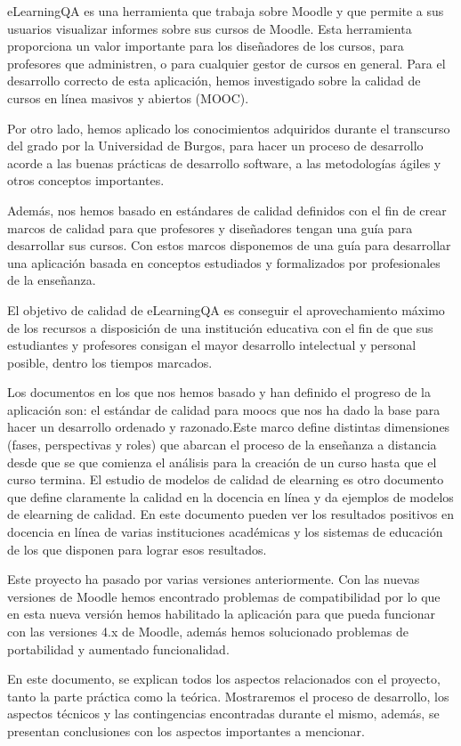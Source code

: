 
eLearningQA es una herramienta que trabaja sobre Moodle y que permite a sus usuarios visualizar informes sobre sus cursos de Moodle. Esta herramienta proporciona un valor importante para los diseñadores de los cursos, para profesores que administren, o para cualquier gestor de cursos en general. Para el desarrollo correcto de esta aplicación, hemos investigado sobre la calidad de cursos en línea masivos y abiertos (MOOC).


Por otro lado, hemos aplicado los conocimientos adquiridos durante el transcurso del grado por la Universidad de Burgos, para hacer un proceso de desarrollo acorde a las buenas prácticas de desarrollo software, a las metodologías ágiles y otros conceptos importantes. 

Además, nos hemos basado en estándares de calidad definidos con el fin de crear marcos de calidad para que profesores y diseñadores 
tengan una guía para desarrollar sus cursos. Con estos marcos disponemos de una guía para desarrollar una aplicación basada en conceptos estudiados y formalizados por profesionales de la enseñanza.

El objetivo de calidad de eLearningQA es conseguir el aprovechamiento máximo de los recursos a disposición de una institución educativa con el fin de que sus estudiantes y profesores consigan el mayor desarrollo intelectual y personal posible, dentro los tiempos marcados.

Los documentos en los que nos hemos basado y han definido el progreso de la aplicación son: el estándar de calidad para moocs \cite{quality-reference-framework} que nos ha dado la base para hacer un desarrollo ordenado y razonado.Este marco define distintas dimensiones (fases, perspectivas y roles) que abarcan el proceso de la enseñanza a distancia desde que se que comienza el análisis para la creación de un curso hasta que el curso termina. El estudio de modelos de calidad de elearning \cite{modelos-calidad-elearning} es otro documento que define claramente la calidad en la docencia en línea y da ejemplos de modelos de elearning de calidad. En este documento pueden ver los resultados positivos en docencia en línea de varias instituciones académicas y los sistemas de educación de los que disponen para lograr esos resultados.

Este proyecto ha pasado por varias versiones anteriormente. Con las nuevas versiones de Moodle hemos encontrado problemas de compatibilidad por lo que en esta nueva versión hemos habilitado la aplicación para que pueda funcionar con las versiones 4.x de Moodle, además hemos solucionado problemas de portabilidad y aumentado funcionalidad.

En este documento, se explican todos los aspectos relacionados con el proyecto, tanto la parte práctica como la teórica. Mostraremos el proceso de desarrollo, los aspectos técnicos y las contingencias encontradas durante el mismo, además, se presentan conclusiones con los aspectos importantes a mencionar. 


